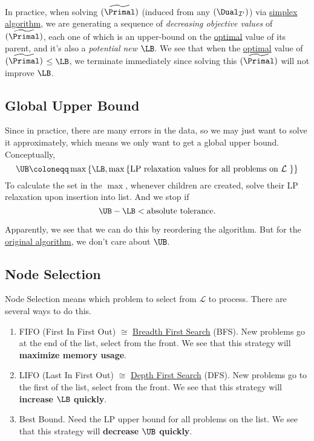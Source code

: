 \begin{remark}
	In practice, when solving \((\widetilde{\Primal})\) (induced from any \((\Dual_{\mathcal{I} ^\prime})\)) via \hyperref[algo:simplex-algorithm]{simplex algorithm}, we are generating a sequence of \emph{decreasing objective values} of \((\widetilde{\Primal})\), each one of which is an upper-bound on the \hyperref[def:optimal-solution]{optimal} value of its parent, and it's also a \emph{potential new \(\LB\)}. We see that when the \hyperref[def:optimal-solution]{optimal} value of \((\widetilde{\Primal})\) \(\leq \LB\), we terminate immediately since solving this \((\widetilde{\Primal})\) will not improve \(\LB\).
\end{remark}

\subsection{Global Upper Bound}
Since in practice, there are many errors in the data, so we may just want to solve it approximately, which means we only want to get a global upper bound. Conceptually,
\[
	\UB \coloneqq \max\left\{\LB, \max\left\{\text{\(\mathrm{LP}\) relaxation values for all problems on \(\mathcal{L}\) }\right\}\right\}
\]
To calculate the set in the \(\max\), whenever children are created, solve their LP relaxation upon insertion into list. And we stop if
\[
	\UB - \LB < \text{absolute tolerance}.
\]

\begin{remark}
	Apparently, we see that we can do this by reordering the algorithm. But for the \hyperref[algo:branch-and-bound-algorithm]{original algorithm}, we don't care about \(\UB\).
\end{remark}

\subsection{Node Selection}\label{subsec:node-selection}
Node Selection means which problem to select from \(\mathcal{L} \) to process. There are several ways to do this.

\begin{enumerate}
	\item FIFO (First In First Out) \(\cong\) \href{https://en.wikipedia.org/wiki/Breadth-first_search}{Breadth First Search} (BFS). New problems go at the end of the list, select from the front. We see that this strategy will \textbf{maximize memory usage}.
	\item LIFO (Last In First Out) \(\cong\) \href{https://en.wikipedia.org/wiki/Depth-first_search}{Depth First Search} (DFS). New problems go to the first of the list, select from the front. We see that this strategy will \textbf{increase \(\LB\) quickly}.
	\item Best Bound. Need the LP upper bound for all problems on the list. We see that this strategy will \textbf{decrease \(\UB\) quickly}.
\end{enumerate}

